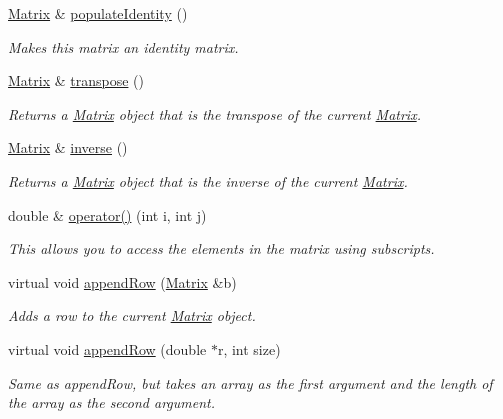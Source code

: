\begin{DoxyCompactItemize}
\hyperlink{class_matrix}{Matrix} \& \hyperlink{class_matrix_a0ee71091770a4e83e54860f291ef1b7d}{populateIdentity} ()
\begin{DoxyCompactList}\small\item\em Makes this matrix an identity matrix. \item\end{DoxyCompactList}\item 
\hyperlink{class_matrix}{Matrix} \& \hyperlink{class_matrix_ad609fedfd61e93679803bb114e544569}{transpose} ()
\begin{DoxyCompactList}\small\item\em Returns a \hyperlink{class_matrix}{Matrix} object that is the transpose of the current \hyperlink{class_matrix}{Matrix}. \item\end{DoxyCompactList}\item 
\hyperlink{class_matrix}{Matrix} \& \hyperlink{class_matrix_a474b9ebea883f90ee54d963f5af8d33e}{inverse} ()
\begin{DoxyCompactList}\small\item\em Returns a \hyperlink{class_matrix}{Matrix} object that is the inverse of the current \hyperlink{class_matrix}{Matrix}. \item\end{DoxyCompactList}\item 
double \& \hyperlink{class_matrix_a83a1c6c6f2f7c88a72a7ee98cae90c24}{operator()} (int i, int j)
\begin{DoxyCompactList}\small\item\em This allows you to access the elements in the matrix using subscripts. \item\end{DoxyCompactList}\item 
virtual void \hyperlink{class_matrix_a20c175983a6b23a83fccfe8f726b3b07}{appendRow} (\hyperlink{class_matrix}{Matrix} \&b)
\begin{DoxyCompactList}\small\item\em Adds a row to the current \hyperlink{class_matrix}{Matrix} object. \item\end{DoxyCompactList}\item 
virtual void \hyperlink{class_matrix_a55104cb3fcf93a887ac713955fc0f5c9}{appendRow} (double $\ast$r, int size)
\begin{DoxyCompactList}\small\item\em Same as appendRow, but takes an array as the first argument and the length of the array as the second argument. \item\end{DoxyCompactList}\item 

\end{DoxyCompactItemize}

